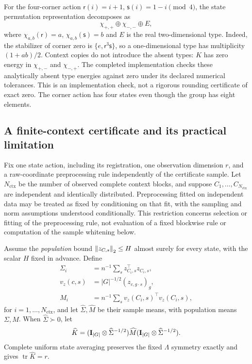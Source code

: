 For the four-corner action $\mathsf r(i)=i+1$, $\mathsf s(i)=1-i\pmod4$, the state permutation representation decomposes as
\[
 \chi_{+,+}\oplus\chi_{-,-}\oplus E,
\]
where $\chi_{a,b}(\mathsf r)=a$, $\chi_{a,b}(\mathsf s)=b$ and $E$ is the real two-dimensional type. Indeed, the stabilizer of corner zero is $\{e,\mathsf r^3\mathsf s\}$, so a one-dimensional type has multiplicity $(1+ab)/2$. Context copies do not introduce the absent types: $K$ has zero energy in $\chi_{+,-}$ and $\chi_{-,+}$. The completed implementation checks these analytically absent type energies against zero under its declared numerical tolerances. This is an implementation check, not a rigorous rounding certificate of exact zero. The corner action has four states even though the group has eight elements.

\subsection{A finite-context certificate and its practical limitation}
\label{sp:certificate}
Fix one state action, including its registration, one observation dimension $r$, and a raw-coordinate preprocessing rule independently of the certificate sample. Let $N_{\mathrm{ctx}}$ be the number of observed complete context blocks, and suppose $C_1,\ldots,C_{N_{\mathrm{ctx}}}$ are independent and identically distributed. Preprocessing fitted on independent data may be treated as fixed by conditioning on that fit, with the sampling and norm assumptions understood conditionally. This restriction concerns selection or fitting of the preprocessing rule, not evaluation of a fixed blockwise rule or computation of the sample whitening below.

Assume the \emph{population} bound $\left\lVert z_{C,s}\right\rVert_2\le H$ almost surely for every state, with the scalar $H$ fixed in advance. Define
\[
 \begin{aligned}
 \Sigma_i
 &=
 n^{-1}\sum_s z_{C_i,s}^\top z_{C_i,s},
 \\
 v_z(c,s)
 &=
 |G|^{-1/2}(z_{c,g\cdot s})_g,
 \\
 M_i
 &=
 n^{-1}\sum_s
 v_z(C_i,s)^\top v_z(C_i,s),
 \end{aligned}
\]
for $i=1,\ldots,N_{\mathrm{ctx}}$, and let $\widehat\Sigma,\widehat M$ be their sample means, with population means $\Sigma,M$. When $\widehat\Sigma\succ0$, let
\[
 \widehat K=(\mathbf{I}_{|G|}\otimes\widehat\Sigma^{-1/2})\widehat M
                    (\mathbf{I}_{|G|}\otimes\widehat\Sigma^{-1/2}).
\]
Complete uniform state averaging preserves the fixed $\Lambda$ symmetry exactly and gives $\operatorname{tr}\widehat K=r$.

